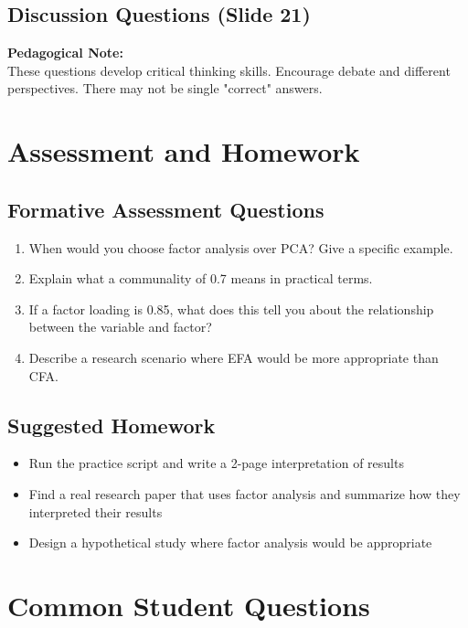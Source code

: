 \documentclass[11pt,a4paper]{article}
\newenvironment{pedagogicalnote}{%
  \begin{framed}
  \noindent\textbf{Pedagogical Note:}\\
}{\end{framed}}
\begin{document}
\subsection{Discussion Questions (Slide 21)}

\begin{pedagogicalnote}
These questions develop critical thinking skills. Encourage debate and different perspectives. There may not be single "correct" answers.
\end{pedagogicalnote}

\section{Assessment and Homework}

\subsection{Formative Assessment Questions}
\begin{enumerate}
    \item When would you choose factor analysis over PCA? Give a specific example.
    \item Explain what a communality of 0.7 means in practical terms.
    \item If a factor loading is 0.85, what does this tell you about the relationship between the variable and factor?
    \item Describe a research scenario where EFA would be more appropriate than CFA.
\end{enumerate}

\subsection{Suggested Homework}
\begin{itemize}
    \item Run the practice script and write a 2-page interpretation of results
    \item Find a real research paper that uses factor analysis and summarize how they interpreted their results
    \item Design a hypothetical study where factor analysis would be appropriate
\end{itemize}

\section{Common Student Questions}
\end{document}
